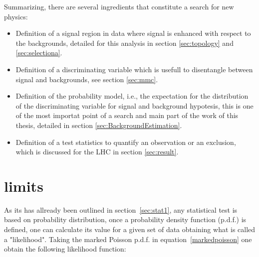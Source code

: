 
Summarizing, there are several ingredients that constitute a search for new physics:
\begin{itemize}
	\item Definition of a signal region in data where signal is enhanced with respect to the backgrounds, detailed for this analysis in section \ref{sec:topology} 
	and \ref{sec:selectiona}.
	\item Definition of a discriminating variable which is usefull to disentangle between signal and backgrounds, see section \ref{sec:mmc}.
	\item Definition of the probability model, i.e., the expectation for the distribution of the discriminating variable
		 for signal and background hypotesis, this is one of the most importat
		point of a search and main part of the work of this thesis, detailed in section \ref{sec:BackgroundEstimation}.
	\item Definition of a test statistics to quantify an observation or an exclusion, which is discussed for the LHC in section \ref{sec:result}.
\end{itemize}

\section{limits}

As its has allready been outlined in section~\ref{sec:stat1}, any statistical test is based on probability
distribution, once a probability density function (p.d.f.) is defined, one can calculate its value for a given 
set of data obtaining what is called a "likelihood".  Taking the marked Poisson
p.d.f. in equation~\eqref{markedpoisson}  one obtain the following likelihood function:
  

